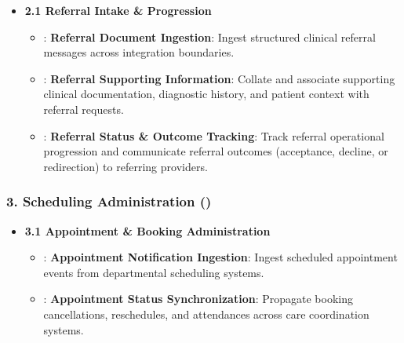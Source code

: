 \begin{itemize}

\item
\textbf{2.1 Referral Intake \& Progression}


\begin{itemize}

\item
\texttt{}: \textbf{Referral Document Ingestion}: Ingest structured clinical referral messages across integration boundaries.



\item
\texttt{}: \textbf{Referral Supporting Information}: Collate and associate supporting clinical documentation, diagnostic history, and patient context with referral requests.



\item
\texttt{}: \textbf{Referral Status \& Outcome Tracking}: Track referral operational progression and communicate referral outcomes (acceptance, decline, or redirection) to referring providers.



\end{itemize}


\end{itemize}
\label{rad:enabling:290}
\subsubsection*{3. Scheduling Administration (\texttt{})}
\label{rad:enabling:291}

\begin{itemize}

\item
\textbf{3.1 Appointment \& Booking Administration}


\begin{itemize}

\item
\texttt{}: \textbf{Appointment Notification Ingestion}: Ingest scheduled appointment events from departmental scheduling systems.



\item
\texttt{}: \textbf{Appointment Status Synchronization}: Propagate booking cancellations, reschedules, and attendances across care coordination systems.



\end{itemize}


\end{itemize}
\label{rad:enabling:295}

